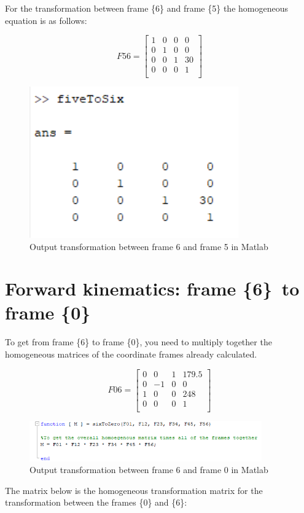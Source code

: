 \documentclass [11pt]{report}
\begin{document}
For the transformation between frame \{6\} and frame \{5\} the homogeneous equation is as follows: 

\begin{equation*}
F56
= 
\begin{bmatrix}
1&0&0&0\\
0&1&0&0\\
0&0&1&30\\
0&0&0&1\\
\end{bmatrix}
\end{equation*}

\begin{figure}[H]
\centerline{\includegraphics[width=9cm]{fiveToSixoutput.png}}
\caption{Output transformation between frame 6 and frame 5 in Matlab}
\label{fig}
\end{figure}

\section{Forward kinematics: frame \{6\}\, to frame \{0\}}

To get from frame \{6\} to frame \{0\}, you need to multiply together the homogeneous matrices of the coordinate frames already calculated. 

\begin{equation*}
F06
=
\begin{bmatrix}
0 & 0 & 1 & 179.5\\
0 & -1 & 0 & 0\\
1 & 0 & 0 & 248\\
0 & 0 & 0 & 1\\
\end{bmatrix}
\end{equation*}

\begin{figure}[H]
\centerline{\includegraphics[width=10cm]{zeroToSixcode.png}}
\caption{Output transformation between frame 6 and frame 0 in Matlab}
\label{fig}
\end{figure}
The matrix below is the homogeneous transformation matrix for the transformation between the frames \{0\} and \{6\}: 
\end{document}
